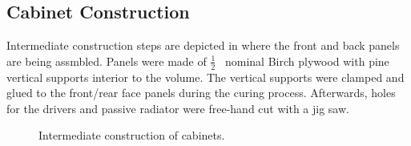 \subsection{Cabinet Construction}
Intermediate construction steps are depicted in  where the front and back panels are being assmbled. Panels were made of $\frac{1}{2}$~\si{\in} nominal Birch plywood with pine vertical supports interior to the volume. The vertical supports were clamped and glued to the front/rear face panels during the curing process. Afterwards, holes for the drivers and passive radiator were free-hand cut with a jig saw.\par
%
\begin{figure}[h!]
\centering
{}
\qquad
{}
\caption{Intermediate construction of cabinets.}
\label{fig:sp_faces}
\end{figure}
